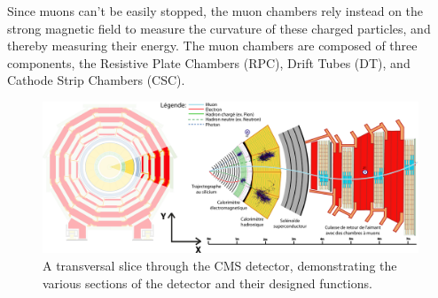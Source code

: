 

Since muons can't be easily stopped, the muon chambers rely
instead on the strong magnetic field to measure the curvature of these charged
particles, and thereby measuring their energy.
The muon chambers are composed of three components, the Resistive Plate Chambers
(RPC), Drift Tubes (DT), and Cathode Strip Chambers (CSC).


\begin{figure}
  \centering
  \includegraphics[width=\textwidth]{images/cms_slice}
  \caption{A transversal slice through the CMS detector, demonstrating the various
  sections of the detector and their designed functions.\cite{cms_slice}}
  \label{fig:cms_slice}
\end{figure}





